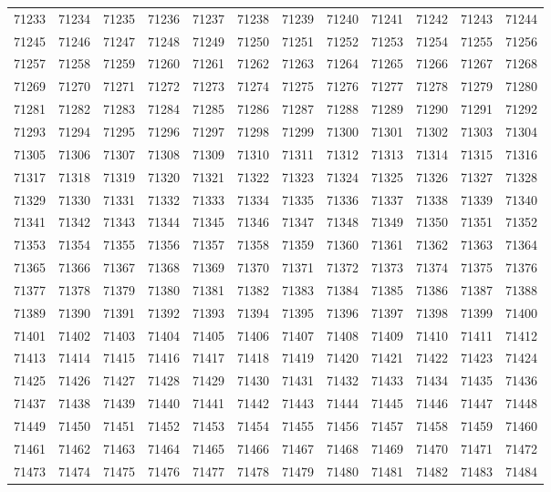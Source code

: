 \begin{center}
\begin{longtable}{llllllllllll}
71233 &71234 &71235 &71236 &71237 &71238 &71239 &71240 &71241 &71242 &71243 &71244 \\
71245 &71246 &71247 &71248 &71249 &71250 &71251 &71252 &71253 &71254 &71255 &71256 \\
71257 &71258 &71259 &71260 &71261 &71262 &71263 &71264 &71265 &71266 &71267 &71268 \\
71269 &71270 &71271 &71272 &71273 &71274 &71275 &71276 &71277 &71278 &71279 &71280 \\
71281 &71282 &71283 &71284 &71285 &71286 &71287 &71288 &71289 &71290 &71291 &71292 \\
71293 &71294 &71295 &71296 &71297 &71298 &71299 &71300 &71301 &71302 &71303 &71304 \\
71305 &71306 &71307 &71308 &71309 &71310 &71311 &71312 &71313 &71314 &71315 &71316 \\
71317 &71318 &71319 &71320 &71321 &71322 &71323 &71324 &71325 &71326 &71327 &71328 \\
71329 &71330 &71331 &71332 &71333 &71334 &71335 &71336 &71337 &71338 &71339 &71340 \\
71341 &71342 &71343 &71344 &71345 &71346 &71347 &71348 &71349 &71350 &71351 &71352 \\
71353 &71354 &71355 &71356 &71357 &71358 &71359 &71360 &71361 &71362 &71363 &71364 \\
71365 &71366 &71367 &71368 &71369 &71370 &71371 &71372 &71373 &71374 &71375 &71376 \\
71377 &71378 &71379 &71380 &71381 &71382 &71383 &71384 &71385 &71386 &71387 &71388 \\
71389 &71390 &71391 &71392 &71393 &71394 &71395 &71396 &71397 &71398 &71399 &71400 \\
71401 &71402 &71403 &71404 &71405 &71406 &71407 &71408 &71409 &71410 &71411 &71412 \\
71413 &71414 &71415 &71416 &71417 &71418 &71419 &71420 &71421 &71422 &71423 &71424 \\
71425 &71426 &71427 &71428 &71429 &71430 &71431 &71432 &71433 &71434 &71435 &71436 \\
71437 &71438 &71439 &71440 &71441 &71442 &71443 &71444 &71445 &71446 &71447 &71448 \\
71449 &71450 &71451 &71452 &71453 &71454 &71455 &71456 &71457 &71458 &71459 &71460 \\
71461 &71462 &71463 &71464 &71465 &71466 &71467 &71468 &71469 &71470 &71471 &71472 \\
71473 &71474 &71475 &71476 &71477 &71478 &71479 &71480 &71481 &71482 &71483 &71484 \\

\end{longtable}
\end{center}
